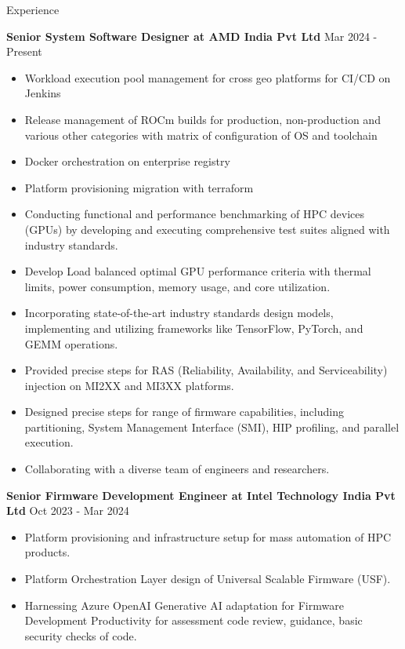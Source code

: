 \documentclass{resume} %
\begin{document}
\begin{rSection}{Experience}

{\bf Senior System Software Designer at AMD India Pvt Ltd} \hfill {Mar 2024 - Present }
\begin{itemize}
\if{}
    \item Workload execution pool management for cross geo platforms for CI/CD on Jenkins
    \item Release management of ROCm builds for production, non-production and various other categories with matrix of configuration of OS and toolchain
    \item Docker orchestration on enterprise registry
    \item Platform provisioning migration with terraform
\fi
    \item Conducting functional and performance benchmarking of HPC devices (GPUs) by developing and executing comprehensive test suites aligned with industry standards.
    \item Develop Load balanced optimal GPU performance criteria with thermal limits, power consumption, memory usage, and core utilization.
    \item Incorporating state-of-the-art industry standards design models, implementing and utilizing frameworks like TensorFlow, PyTorch, and GEMM operations.
    \item Provided precise steps for RAS (Reliability, Availability, and Serviceability) injection on MI2XX and MI3XX platforms.
    \item Designed precise steps for range of firmware capabilities, including partitioning, System Management Interface (SMI), HIP profiling, and parallel execution.
\if{}
    \item Collaborating with a diverse team of engineers and researchers.
\fi
\end{itemize}

{\textbf{Senior Firmware Development Engineer at Intel Technology India Pvt Ltd}}  \hfill {Oct 2023 - Mar 2024}
\begin{itemize}
    \item Platform provisioning and infrastructure setup for mass automation of HPC products.
    \item Platform Orchestration Layer design of Universal Scalable Firmware (USF).
    \item Harnessing Azure OpenAI Generative AI adaptation for Firmware Development Productivity for assessment code review, guidance, basic security checks of code.


\end{itemize}
\end{rSection}
\end{document}
